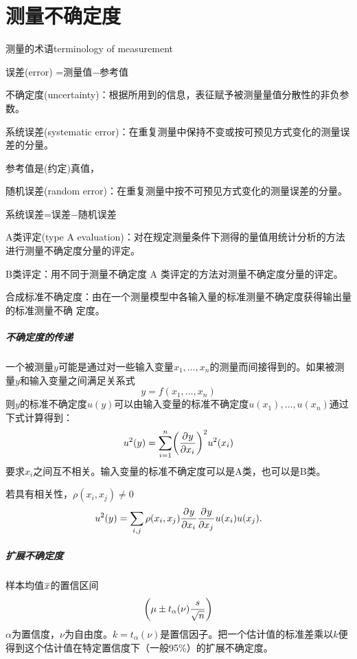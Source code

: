 \chapter{测量不确定度}
\begin{definition}{测量的术语}{terminology of measurement}
	\begin{compactitem}
		\item 误差(error) =测量值$-$参考值
		\item 不确定度(uncertainty)：根据所用到的信息，表征赋予被测量量值分散性的非负参数。
		\item 系统误差(systematic error)：在重复测量中保持不变或按可预见方式变化的测量误差的分量。
		
		参考值是(约定)真值，
		\item 随机误差(random error)：在重复测量中按不可预见方式变化的测量误差的分量。
		
		系统误差=误差$-$随机误差
		\item A类评定(type A evaluation)：对在规定测量条件下测得的量值用统计分析的方法进行测量不确定度分量的评定。
		\item B类评定：用不同于测量不确定度 A 类评定的方法对测量不确定度分量的评定。
		\item 合成标准不确定度：由在一个测量模型中各输入量的标准测量不确定度获得输出量的标准测量不确	定度。
	\end{compactitem}
\end{definition}
\paragraph{不确定度的传递}
一个被测量$ y $可能是通过对一些输入变量$x_1,\ldots,x_n$的测量而间接得到的。如果被测量$ y $和输入变量之间满足关系式
\[
	y=f(x_1,\ldots,x_n)
\]
则$ y $的标准不确定度$ u(y) $可以由输入变量的标准不确定度$u(x_1),\ldots,u(x_n)$通过下式计算得到：
\begin{equation}
	u^2(y)=\sum_{i=1}^n\biggl(\frac{\partial^{{}}y}{\partial{x_i}^{{}}}\biggr)^2u^2(x_i)
\end{equation}
要求$x_i$之间互不相关。输入变量的标准不确定度可以是A类，也可以是B类。

若具有相关性，$\rho(x_i,x_j)\neq 0$
\begin{equation}
	u^2(y)=\sum_{i,j}\rho(x_i,x_j)\frac{\partial^{{}}y}{\partial{x_i}^{{}}}\frac{\partial^{{}}y}{\partial{x_j}^{{}}}u(x_i)u(x_j).
\end{equation}
\paragraph{扩展不确定度}
样本均值$\overline{x}$的置信区间
\[
	\biggl(\mu\pm t_{\alpha}(\nu)\frac s{\sqrt n}\biggr)
\]
$\alpha$为置信度，$\nu$为自由度。$k=t_{\alpha}(\nu)$是置信因子。把一个估计值的标准差乘以$ k $便得到这个估计值在特定置信度下（一般95\%）的扩展不确定度。
